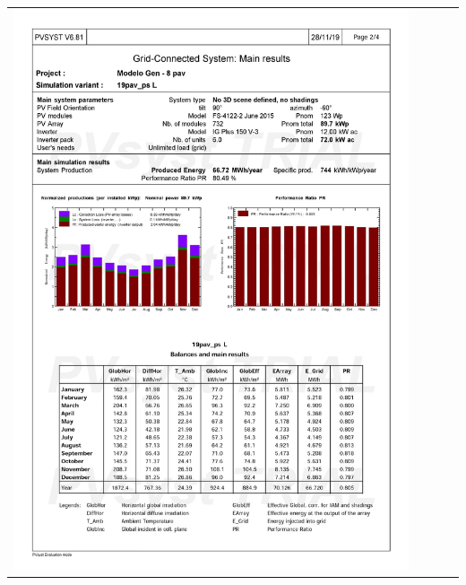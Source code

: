 \begin{table}[H]
    \centering
    \begin{tabular}{l}
        \includegraphics[width=0.9\textwidth]{figures/attachments/resultpv24.jpg}
    \end{tabular}
\end{table}
\pagebreak

